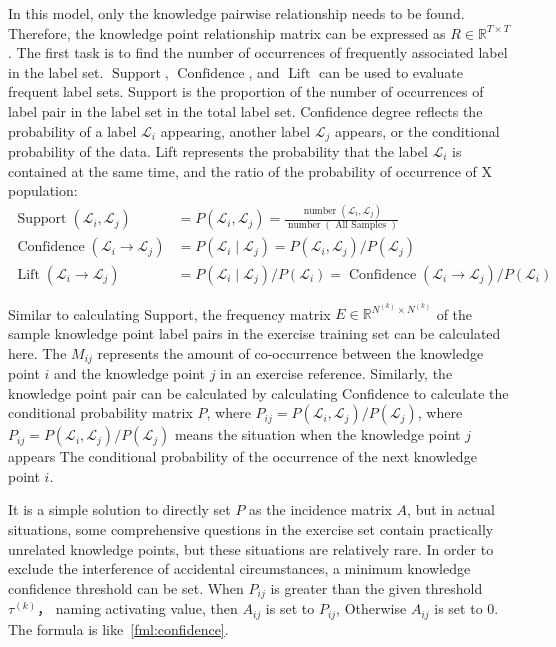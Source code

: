 In this model, only the knowledge pairwise relationship needs to be found. Therefore, the knowledge point relationship matrix can be expressed as \(R\in \mathbb{R}^{T\times T}\). The first task is to find the number of occurrences of frequently associated label in the label set. \(\operatorname{Support}\), \(\operatorname{Confidence}\), and \(\operatorname{Lift}\) can be used to evaluate frequent label sets. Support is the proportion of the number of occurrences of label pair in the label set in the total label set. Confidence degree reflects the probability of a label \(\mathcal{L}_i\) appearing, another label \(\mathcal{L}_j\) appears, or the conditional probability of the data. Lift represents the probability that the label \(\mathcal{L}_i\) is contained at the same time, and the ratio of the probability of occurrence of X population:
\begin{align}
	\operatorname{Support}(\mathcal{L}_i, \mathcal{L}_j)       & =P(\mathcal{L}_i,\mathcal{L}_j)=\frac{\operatorname{number}(\mathcal{L}_i,\mathcal{L}_j)}{\operatorname{number}(\text{ All Samples })} \\
	\operatorname{Confidence}(\mathcal{L}_i \to \mathcal{L}_j) & =P(\mathcal{L}_i \mid \mathcal{L}_j)=P(\mathcal{L}_i, \mathcal{L}_j) / P(\mathcal{L}_j)                                                \\
	\operatorname{Lift}(\mathcal{L}_i \to \mathcal{L}_j)       & =P(\mathcal{L}_i \mid \mathcal{L}_j) / P(\mathcal{L}_i)=\operatorname{Confidence}(\mathcal{L}_i \to \mathcal{L}_j) / P(\mathcal{L}_i)
\end{align}

Similar to calculating Support, the frequency matrix \(E\in \mathbb{R}^{N^{(k)}\times N^{(k)}}\) of the sample knowledge point label pairs in the exercise training set can be calculated here. The \(M_{ij}\) represents the amount of co-occurrence between the knowledge point \(i\) and the knowledge point \(j\) in an exercise reference. Similarly, the knowledge point pair can be calculated by calculating Confidence to calculate the conditional probability matrix \(P\), where \(P_{ij}=P(\mathcal{L}_i, \mathcal{L}_j)/P(\mathcal{L}_j)\), where \(P_{ij}=P(\mathcal{L}_i, \mathcal{L}_j)/P(\mathcal{L}_j)\) means the situation when the knowledge point \(j\) appears The conditional probability of the occurrence of the next knowledge point \(i\).

It is a simple solution to directly set \(P\) as the incidence matrix \(A\), but in actual situations, some comprehensive questions in the exercise set contain practically unrelated knowledge points, but these situations are relatively rare. In order to exclude the interference of accidental circumstances, a minimum knowledge confidence threshold can be set. When \(P_{ij}\) is greater than the given threshold \(\tau^{(k)} \)， naming activating value, then \(A_{ij}\) is set to \(P_{ij}\), Otherwise \(A_{ij}\) is set to 0. The formula is like~\ref{fml:confidence}.

